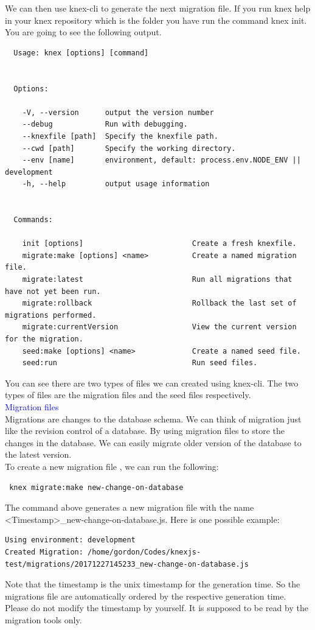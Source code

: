 \documentclass[a4paper]{article}
\begin{document}
We can then use knex-cli to generate the next migration file. If you run knex help in your knex repository which is the folder you have run the command knex init. You are going to see the following output.
\begin{lstlisting}
  Usage: knex [options] [command]


  Options:

    -V, --version      output the version number
    --debug            Run with debugging.
    --knexfile [path]  Specify the knexfile path.
    --cwd [path]       Specify the working directory.
    --env [name]       environment, default: process.env.NODE_ENV || development
    -h, --help         output usage information


  Commands:

    init [options]                         Create a fresh knexfile.
    migrate:make [options] <name>          Create a named migration file.
    migrate:latest                         Run all migrations that have not yet been run.
    migrate:rollback                       Rollback the last set of migrations performed.
    migrate:currentVersion                 View the current version for the migration.
    seed:make [options] <name>             Create a named seed file.
    seed:run                               Run seed files.
\end{lstlisting}

You can see there are two types of files we can created using knex-cli. The two types of files are the migration files and the seed files respectively.\\

\textcolor{blue}{Migration files}\\

Migrations are changes to the database schema. We can think of migration just like the revision control of a database. By using migration files to store the changes in the database. We can easily migrate older version of the database to the latest version.\\

To create a new migration file , we can run the following:
\begin{lstlisting}
 knex migrate:make new-change-on-database
\end{lstlisting}
The command above generates a new migration file with the name <Timestamp>_new-change-on-database.js. Here is one possible example:
\begin{lstlisting}
Using environment: development
Created Migration: /home/gordon/Codes/knexjs-test/migrations/20171227145233_new-change-on-database.js
\end{lstlisting}
Note that the timestamp is the unix timestamp for the generation time. So the migrations file are automatically ordered by the respective generation time. Please do not modify the timestamp by yourself. It is supposed to be read by the migration tools only.\\
\end{document}
